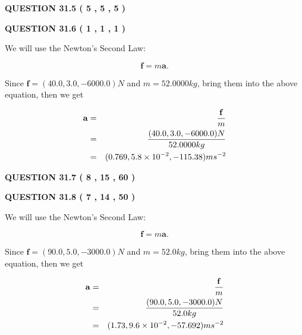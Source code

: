 \documentclass[12pt]{article}
\begin{document}
\vspace{0.2in}
  
{\textbf{\Large{QUESTION
31.5 
 (           5 ,           5 ,           5 )
}}}
  
  
  
\vspace{0.2in}
  
{\textbf{\Large{QUESTION
31.6 
 (           1 ,           1 ,           1 )
}}}
  
  


 
 

We will use the Newton's Second Law:
 
\[
\mathbf{f}=m\mathbf{a}.
\]
 
Since $\mathbf{f}= %
(40.0 , 3.0 , -6000.0) N$
and $m= %
52.0000kg$, bring them into the above equation, then we get
 
\begin{eqnarray*}
\mathbf{a}&=&\frac{\mathbf{f}}m  \\
&=&\frac{ %
(40.0 , 3.0 , -6000.0) N}{ %
52.0000kg}  \\
&=& %
(0.769 , 5.8 \times 10^{-2} , -115.38) ms^{-2}
\end{eqnarray*}
 
 
 
  
\vspace{0.2in}
  
{\textbf{\Large{QUESTION
31.7 
 (           8 ,          15 ,          60 )
}}}
  
  
 
 

 
 
  
\vspace{0.2in}
  
{\textbf{\Large{QUESTION
31.8 
 (           7 ,          14 ,          50 )
}}}
  
  
 
 

We will use the Newton's Second Law:
 
\[
\mathbf{f}=m\mathbf{a}.
\]
 
Since $\mathbf{f}= %
(90.0 , 5.0 , -3000.0) N$
and $m= %
52.0kg$, bring them into the above equation, then we get
 
\begin{eqnarray*}
\mathbf{a}&=&\frac{\mathbf{f}}m  \\
&=&\frac{ %
(90.0 , 5.0 , -3000.0) N}{ %
52.0kg}  \\
&=& %
(1.73 , 9.6 \times 10^{-2} , -57.692) ms^{-2}
\end{eqnarray*}
 
\end{document}
